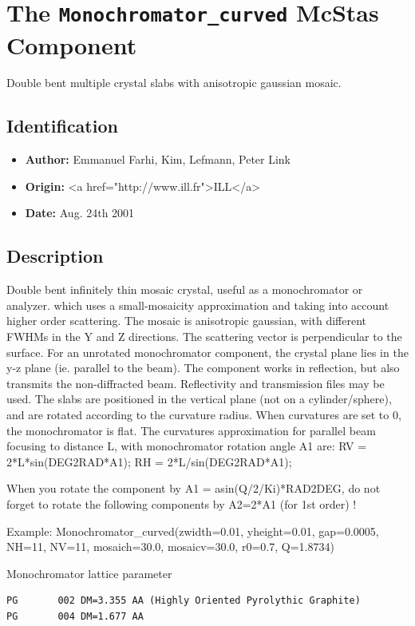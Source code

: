 \section{The \texttt{Monochromator\_curved} McStas Component}
Double bent multiple crystal slabs with anisotropic gaussian mosaic.

\subsection*{Identification}
\begin{itemize}
  \item \textbf{Author:} Emmanuel Farhi, Kim, Lefmann, Peter Link
  \item \textbf{Origin:} \textless{}a href="http://www.ill.fr"\textgreater{}ILL\textless{}/a\textgreater{}
  \item \textbf{Date:} Aug. 24th 2001
\end{itemize}

\subsection*{Description}
Double bent infinitely thin mosaic crystal, useful as a monochromator or analyzer. which uses a small-mosaicity approximation and taking into account higher order scattering. The mosaic is anisotropic gaussian, with different FWHMs in the Y and Z directions. The scattering vector is perpendicular to the surface. For an unrotated monochromator component, the crystal plane lies in the y-z plane (ie. parallel to the beam). The component works in reflection, but also transmits the non-diffracted beam. Reflectivity and transmission files may be used. The slabs are positioned in the vertical plane (not on a cylinder/sphere), and are rotated according to the curvature radius. When curvatures are set to 0, the monochromator is flat. The curvatures approximation for parallel beam focusing to distance L, with monochromator rotation angle A1 are: RV = 2*L*sin(DEG2RAD*A1); RH = 2*L/sin(DEG2RAD*A1);

When you rotate the component by A1 = asin(Q/2/Ki)*RAD2DEG, do not forget to rotate the following components by A2=2*A1 (for 1st order) !

Example: Monochromator\_curved(zwidth=0.01, yheight=0.01, gap=0.0005, NH=11, NV=11, mosaich=30.0, mosaicv=30.0, r0=0.7, Q=1.8734)

Monochromator lattice parameter

\begin{verbatim}
PG       002 DM=3.355 AA (Highly Oriented Pyrolythic Graphite)
PG       004 DM=1.677 AA
\end{verbatim}

